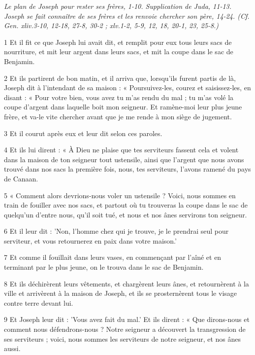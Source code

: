
\par \textit{Le plan de Joseph pour rester ses frères, 1-10. Supplication de Juda, 11-13. Joseph se fait connaître de ses frères et les renvoie chercher son père, 14-24. (Cf. Gen. xliv.3-10, 12-18, 27-8, 30-2 ; xlv.1-2, 5-9, 12, 18, 20-1, 23, 25-8.)}

\par 1 Et il fit ce que Joseph lui avait dit, et remplit pour eux tous leurs sacs de nourriture, et mit leur argent dans leurs sacs, et mit la coupe dans le sac de Benjamin.
\par 2 Et ils partirent de bon matin, et il arriva que, lorsqu'ils furent partis de là, Joseph dit à l'intendant de sa maison : « Poursuivez-les, courez et saisissez-les, en disant : « Pour votre bien, vous avez tu m'as rendu du mal ; tu m'as volé la coupe d'argent dans laquelle boit mon seigneur. Et ramène-moi leur plus jeune frère, et va-le vite chercher avant que je me rende à mon siège de jugement.
\par 3 Et il courut après eux et leur dit selon ces paroles.
\par 4 Et ils lui dirent : « À Dieu ne plaise que tes serviteurs fassent cela et volent dans la maison de ton seigneur tout ustensile, ainsi que l'argent que nous avons trouvé dans nos sacs la première fois, nous, tes serviteurs, l'avons ramené du pays de Canaan.
\par 5 « Comment alors devrions-nous voler un ustensile ? Voici, nous sommes en train de fouiller avec nos sacs, et partout où tu trouveras la coupe dans le sac de quelqu'un d'entre nous, qu'il soit tué, et nous et nos ânes servirons ton seigneur.
\par 6 Et il leur dit : 'Non, l'homme chez qui je trouve, je le prendrai seul pour serviteur, et vous retournerez en paix dans votre maison.'
\par 7 Et comme il fouillait dans leurs vases, en commençant par l'aîné et en terminant par le plus jeune, on le trouva dans le sac de Benjamin.
\par 8 Et ils déchirèrent leurs vêtements, et chargèrent leurs ânes, et retournèrent à la ville et arrivèrent à la maison de Joseph, et ils se prosternèrent tous le visage contre terre devant lui.
\par 9 Et Joseph leur dit : 'Vous avez fait du mal.' Et ils dirent : « Que dirons-nous et comment nous défendrons-nous ? Notre seigneur a découvert la transgression de ses serviteurs ; voici, nous sommes les serviteurs de notre seigneur, et nos ânes aussi.

